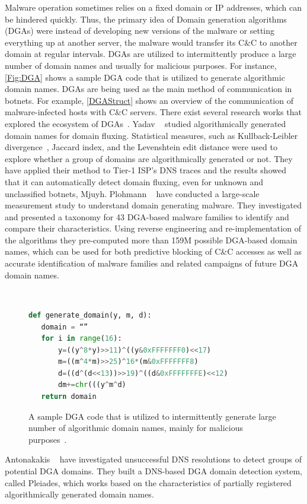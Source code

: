 \label{sec:DGA}
Malware operation sometimes relies on a fixed domain or IP addresses, which can be hindered quickly. Thus, the primary idea of Domain generation algorithms (DGAs) were instead of developing new versions of the malware or setting everything up at another server, the malware would transfer its C\&C to another domain at regular intervals. DGAs are utilized to intermittently produce a large number of domain names and usually for malicious purposes. For instance, \autoref{Fig:DGA} shows a sample DGA code that is utilized to generate algorithmic domain names. DGAs are being used as the main method of communication in botnets. For example, \autoref{DGAStruct} shows an overview of the communication of malware-infected hosts with C\&C servers. There exist several research works that explored the ecosystem of DGAs~. 
Yadav \etal~ studied algorithmically generated domain names for domain fluxing. Statistical measures, such as Kullback-Leibler divergence~, Jaccard index, and the Levenshtein edit distance were used to explore whether a group of domains are algorithmically generated or not. They have applied their method to Tier-1 ISP's DNS traces and the results showed that it can automatically detect domain fluxing, even for unknown and unclassified botnets, \eg Mjuyh.
Plohmann \etal~ have conducted a large-scale measurement study to understand domain generating malware. They investigated and presented a taxonomy for 43 DGA-based malware families to identify and compare their characteristics. Using reverse engineering and re-implementation of the algorithms they pre-computed more than 159M possible DGA-based domain names, which can be used for both predictive blocking of C\&C accesses as well as accurate identification of malware families and related campaigns of future DGA domain names. 
\begin{figure}[t]
{\tt
\begin{lstlisting}[language=Python]
def generate_domain(y, m, d):
   domain = “”
   for i in range(16):
       y=((y^8*y)>>11)^((y&0xFFFFFFF0)<<17)
       m=((m^4*m)>>25)^16*(m&0xFFFFFFF8)
       d=((d^(d<<13))>>19)^((d&0xFFFFFFFE)<<12)
       dm+=chr(((y^m^d)
   return domain
\end{lstlisting}
}
\caption{A sample DGA code that is utilized to intermittently generate large number of algorithmic domain names, mainly for malicious purposes~.}
\label{Fig:DGA}
\end{figure}
Antonakakis \etal~ have investigated unsuccessful DNS resolutions to detect groups of potential DGA domains. They built a DNS-based DGA domain detection system, called Pleiades, which works based on the characteristics of partially registered algorithmically generated domain names. 
